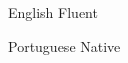 

\begin{cvskills}

  \cvskill
    {English} %
    {Fluent} %

  \cvskill
    {Portuguese} %
    {Native} %

\end{cvskills}
